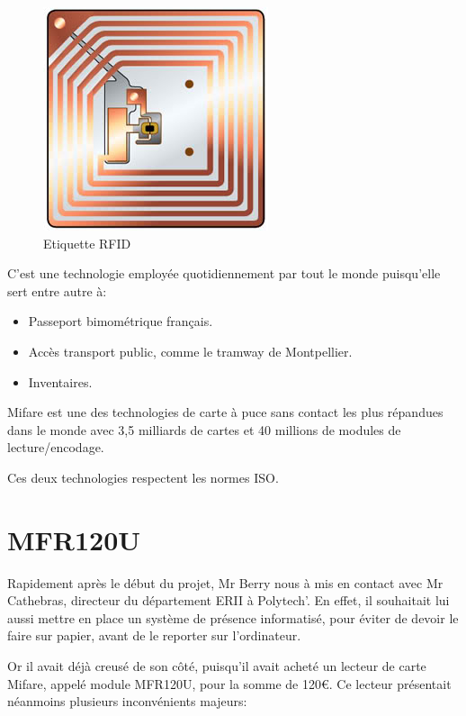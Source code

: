     \begin{figure}[h]
        \begin{center}
            \includegraphics[scale=0.6]{RFIDtag.jpg} 
        \end{center}

        \caption{Etiquette RFID}
        \label{Etiquette RFID}
    \end{figure}


C'est une technologie employée quotidiennement par tout le monde puisqu'elle
sert entre autre à:

\begin{itemize}
\item Passeport bimométrique français.
\item Accès transport public, comme le tramway de Montpellier.
\item Inventaires.
\end{itemize}

Mifare est une des technologies de carte à puce sans contact les plus répandues
dans le monde avec 3,5 milliards de cartes et 40 millions de modules de lecture/encodage.

Ces deux technologies respectent les normes ISO.




\section{MFR120U}
    Rapidement après le début du projet, Mr Berry nous à mis en contact avec Mr
Cathebras, directeur du département ERII à Polytech'. En effet, il souhaitait lui
aussi mettre en place un système de présence informatisé, pour éviter de devoir
le faire sur papier, avant de le reporter sur l'ordinateur.

    Or il avait déjà creusé de son côté, puisqu'il avait acheté un lecteur de carte 
Mifare, appelé module MFR120U, pour la somme de 120\euro. Ce lecteur présentait néanmoins
plusieurs inconvénients majeurs:

